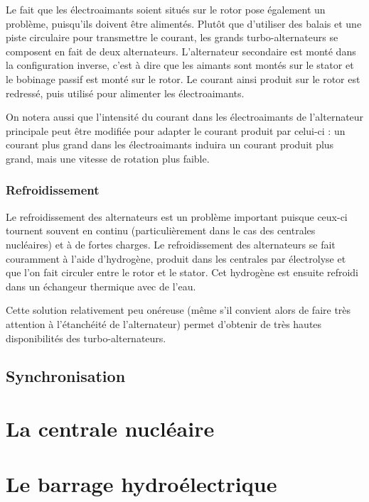 \documentclass[12pt,a4paper,oneside,openany]{memoir}
\begin{document}
Le fait que les électroaimants soient situés sur le rotor pose également un problème, puisqu'ils doivent être alimentés. Plutôt que d'utiliser des balais et une piste circulaire pour transmettre le courant, les grands turbo-alternateurs se composent en fait de deux alternateurs. L'alternateur secondaire est monté dans la configuration inverse, c'est à dire que les aimants sont montés sur le stator et le bobinage passif est monté sur le rotor. Le courant ainsi produit sur le rotor est redressé, puis utilisé pour alimenter les électroaimants.

On notera aussi que l'intensité du courant dans les électroaimants de l'alternateur principale peut être modifiée pour adapter le courant produit par celui-ci : un courant plus grand dans les électroaimants induira un courant produit plus grand, mais une vitesse de rotation plus faible.


\subsection{Refroidissement}
Le refroidissement des alternateurs est un problème important puisque ceux-ci tournent souvent en continu (particulièrement dans le cas des centrales nucléaires) et à de fortes charges. Le refroidissement des alternateurs se fait couramment à l'aide d'hydrogène, produit dans les centrales par électrolyse et que l'on fait circuler entre le rotor et le stator. Cet hydrogène est ensuite refroidi dans un échangeur thermique avec de l'eau.

Cette solution relativement peu onéreuse (même s'il convient alors de faire très attention à l'étanchéité de l'alternateur) permet d'obtenir de très hautes disponibilités des turbo-alternateurs.


\section{Synchronisation}



\chapter{La centrale nucléaire}


\chapter{Le barrage hydroélectrique}
\end{document}
